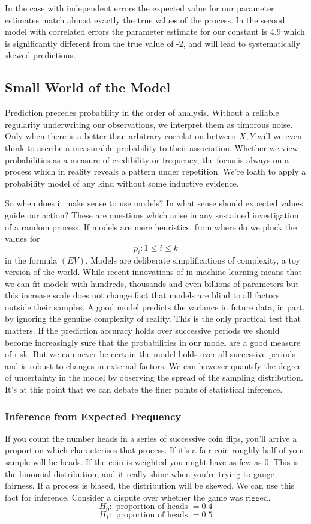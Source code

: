 \documentclass[10pt,a4paper,notitlepage, twocolumn]{article}
\begin{document}
In the case with independent errors the expected value for our parameter estimates match almost exactly the true values of the process. In the second model with correlated errors the parameter estimate for our constant is 4.9 which is significantly different from the true value of -2, and will lead to systematically skewed predictions.

\subsection*{Small World of the Model}
Prediction precedes probability in the order of analysis. Without a reliable regularity underwriting our observations, we interpret them as timorous noise. Only when there is a better than arbitrary correlation between $X, Y$ will we even think to ascribe a measurable probability to their association. Whether we view probabilities as a measure of credibility or frequency, the focus is always on a process which in reality reveals a pattern under repetition. We're loath to apply a probability model of any kind without some inductive evidence.
\newline 

\noindent So when does it make sense to use models? In what sense should expected values guide our action? These are questions which arise in any sustained investigation of a random process. If models are mere heuristics, from where do we pluck the values for $$p_{i} : 1 \leq i \leq k$$ in the formula $(EV)$. Models are deliberate simplifications of complexity, a toy version of the world. While recent innovations of in machine learning means that we can fit models with hundreds, thousands and even billions of parameters but this increase scale does not change fact that models are blind to all factors outside their samples. A good model predicts the variance in future data, in part, by ignoring the genuine complexity of reality. This is the only practical test that matters. If the prediction accuracy holds over successive periods we should become increasingly sure that the probabilities in our model are a good measure of risk. But we can never be certain the model holds over all successive periods and is robust to changes in external factors. We can however quantify the degree of uncertainty in the model by observing the spread of the sampling distribution. It's at this point that we can debate the finer points of statistical inference. 

\subsubsection*{Inference from Expected Frequency}
If you count the number heads in a series of successive coin flips, you'll arrive a proportion which characterises that process. If it's a fair coin roughly half of your sample will be heads. If the coin is weighted you might have as few as 0. This is the binomial distribution, and it really shine when you're trying to gauge fairness. If a process is biased, the distribution will be skewed. We can use this fact for inference. Consider a dispute over whether the game was rigged. 
$$ H_0 : \text{ proportion of heads } = 0.4  $$
$$ H_1 : \text{ proportion of heads } =  0.5 $$
\end{document}
